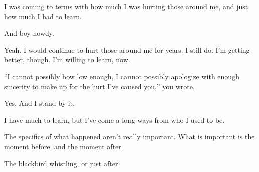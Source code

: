 I was coming to terms with how much I was hurting those around me, and just how much I had to learn.

\begin{ally}
And boy howdy.
\end{ally}
Yeah. I would continue to hurt those around me for years. I still do. I'm getting better, though. I'm willing to learn, now.

\begin{ally}
``I cannot possibly bow low enough, I cannot possibly apologize with enough sincerity to make up for the hurt I've caused you,'' you wrote.
\end{ally}
Yes. And I stand by it.

I have much to learn, but I've come a long ways from who I used to be.

The specifics of what happened aren't really important. What is important is the moment before, and the moment after.

\begin{ally}
The blackbird whistling, or just after.
\end{ally}
\newpage
